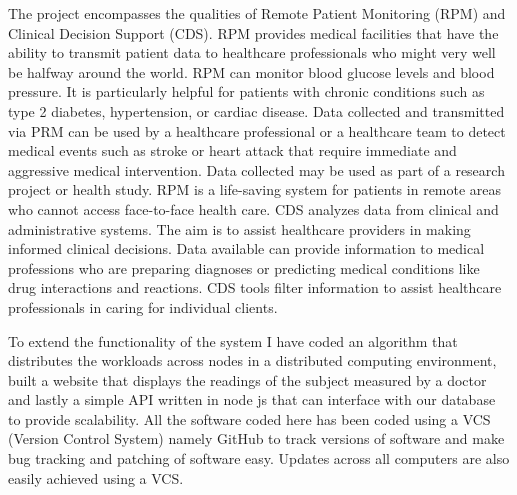 \documentclass[12pt]{article}
\begin{document}
The project encompasses the qualities of Remote Patient Monitoring (RPM)\cite{rpm} and Clinical Decision Support (CDS)\cite{cds}. RPM provides medical facilities that have the ability to transmit patient data to healthcare professionals who might very well be halfway around the world. RPM can monitor blood glucose levels and blood pressure. It is particularly helpful for patients with chronic conditions such as type 2 diabetes, hypertension, or cardiac disease. Data collected and transmitted via PRM can be used by a healthcare professional or a healthcare team to detect medical events such as stroke or heart attack that require immediate and aggressive medical intervention. Data collected may be used as part of a research project or health study. RPM is a life-saving system for patients in remote areas who cannot access face-to-face health care. CDS analyzes data from clinical and administrative systems. The aim is to assist healthcare providers in making informed clinical decisions. Data available can provide information to medical professions who are preparing diagnoses or predicting medical conditions like drug interactions and reactions. CDS tools filter information to assist healthcare professionals in caring for individual clients. 

To extend the functionality of the system I have coded an algorithm that distributes the workloads across nodes in a distributed computing environment, built a website that displays the readings of the subject measured by a doctor and lastly a simple API written in node js that can interface with our database to provide scalability. All the software coded here has been coded using a VCS (Version Control System) namely GitHub to track versions of software and make bug tracking and patching of software easy. Updates across all computers are also easily achieved using a VCS.
\end{document}

